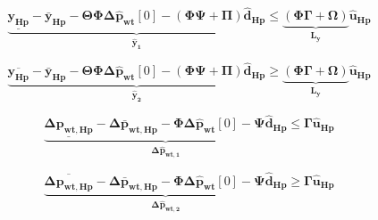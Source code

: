 \begin{equation}
\underbrace{\underline{\bm{y_{Hp}}} - \bm{\bar{y}_{Hp}} - \bm{\Theta} \bm{\Phi} \bm{\Delta \hat{p}_{wt}}[0] - (\bm{\Phi \Psi + \Pi}) \bm{\hat{d}_{Hp}}}_{\bm{\hat{y}_1}} \leq \underbrace{(\bm{\Phi \Gamma + \Omega})}_{\bm{L_y}} \bm{\hat{u}_{Hp}}
\end{equation}

\begin{equation}
\underbrace{\overline{\bm{y_{Hp}}} - \bm{\bar{y}_{Hp}} - \bm{\Theta} \bm{\Phi} \bm{\Delta \hat{p}_{wt}}[0] - (\bm{\Phi \Psi + \Pi}) \bm{\hat{d}_{Hp}}}_{\bm{\hat{y}_2}} \geq \underbrace{(\bm{\Phi \Gamma + \Omega})}_{\bm{L_y}} \bm{\hat{u}_{Hp}}
\end{equation}

\begin{equation}
\underbrace{\underline{\bm{\Delta p_{wt,Hp}}} - \bm{\Delta \bar{p}_{wt,Hp}} -  \bm{\Phi} \bm{\Delta \hat{p}_{wt}}[0] - \bm{\Psi} \bm{\hat{d}_{Hp}}}_{\bm{\Delta \hat{p}_{wt,1}}} \leq \bm{\Gamma} \bm{\hat{u}_{Hp}}
\end{equation}

\begin{equation}
\underbrace{\overline{\bm{\Delta p_{wt,Hp}}} - \bm{\Delta \bar{p}_{wt,Hp}} -  \bm{\Phi} \bm{\Delta \hat{p}_{wt}}[0] - \bm{\Psi} \bm{\hat{d}_{Hp}}}_{\bm{\Delta \hat{p}_{wt,2}}} \geq \bm{\Gamma} \bm{\hat{u}_{Hp}}
\end{equation}




